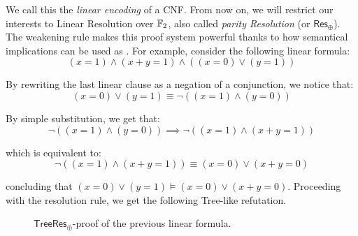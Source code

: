 We call this the \textit{linear encoding} of a CNF. From now on, we will restrict our interests to Linear Resolution over $\mathbb{F}_2$, also called \textit{parity Resolution} (or $\mathsf{Res}_\oplus$). The weakening rule makes this proof system powerful thanks to how semantical implications can be used as . For example, consider the following linear formula:
\[(x = 1) \land (x+y = 1) \land ((x = 0) \lor (y = 1))\]

\noindent
By rewriting the last linear clause as a negation of a conjunction, we notice that:
\[(x = 0) \lor (y = 1) \equiv \lnot ((x = 1) \land (y = 0))\]

\noindent
By simple substitution, we get that:
\[\lnot ((x = 1) \land (y = 0)) \implies  \lnot ((x = 1) \land (x+y = 1))\]

\noindent
which is equivalent to:
\[\lnot ((x = 1) \land (x+y = 1)) \equiv (x = 0) \lor (x+y = 0)\]

\noindent
concluding that $(x = 0) \lor (y = 1) \models (x = 0) \lor (x+y = 0)$. Proceeding with the resolution rule, we get the following Tree-like refutation.
\begin{figure}[H]
    \centering
    

    \caption{$\mathsf{TreeRes}_\oplus$-proof of the previous linear formula.}
    \label{treelike_proof}
\end{figure}

